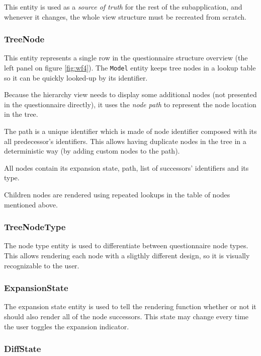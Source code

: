 This entity is used as a \textit{source of truth} for the rest of the subapplication, and whenever it changes, the whole view structure must be recreated from scratch.

\subsubsection*{TreeNode}

This entity represents a single row in the questionnaire structure overview (the left panel on figure \ref{fig:wf4}).
The \texttt{Model} entity keeps tree nodes in a lookup table so it can be quickly looked-up by its identifier.

Because the hierarchy view needs to display some additional nodes (not presented in the questionnaire directly), it uses the \textit{node path} to represent the node location in the tree.

The path is a unique identifier which is made of node identifier composed with its all predecessor's identifiers.
This allows having duplicate nodes in the tree in a deterministic way (by adding custom nodes to the path).

All nodes contain its expansion state, path, list of successors' identifiers and its type.

Children nodes are rendered using repeated lookups in the table of nodes mentioned above.

\subsubsection*{TreeNodeType}

The node type entity is used to differentiate between questionnaire node types.
This allows rendering each node with a sligthly different design, so it is visually recognizable to the user.

\subsubsection*{ExpansionState}

The expansion state entity is used to tell the rendering function whether or not it should also render all of the node successors.
This state may change every time the user toggles the expansion indicator.

\subsubsection*{DiffState}\label{sec:diffstate}

